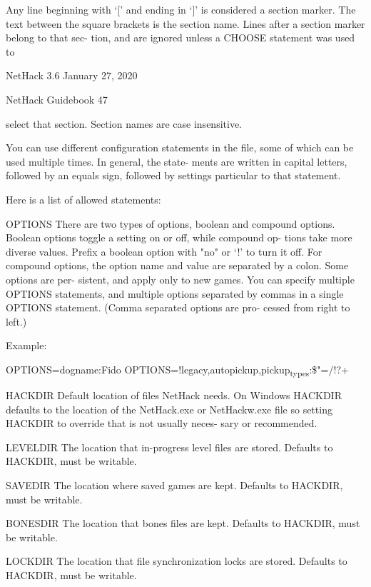 \documentclass[11pt]{article}
\begin{document}
   Any line beginning with `[' and ending in `]' is considered
a section marker.  The text between the square brackets is the
section name. Lines after a section marker belong to that sec-
tion, and are ignored unless a CHOOSE statement was used to


NetHack 3.6                   January 27, 2020





NetHack Guidebook                       47



select that section. Section names are case insensitive.

   You can use different configuration statements in the file,
some of which can be used multiple times. In general, the state-
ments are written in capital letters, followed by an equals sign,
followed by settings particular to that statement.

Here is a list of allowed statements:

OPTIONS
 There are two types of options, boolean and compound options.
 Boolean options toggle a setting on or off, while compound op-
 tions take more diverse values. Prefix a boolean option with
 "no" or `!' to turn it off. For compound options, the option
 name and value are separated by a colon. Some options are per-
 sistent, and apply only to new games. You can specify multiple
 OPTIONS statements, and multiple options separated by commas in
 a single OPTIONS statement. (Comma separated options are pro-
 cessed from right to left.)

Example:

OPTIONS=dogname:Fido
OPTIONS=!legacy,autopickup,pickup\textsubscript{types}:\$"=/!?+

HACKDIR
 Default location of files NetHack needs. On Windows HACKDIR
 defaults to the location of the NetHack.exe or NetHackw.exe
 file so setting HACKDIR to override that is not usually neces-
 sary or recommended.

LEVELDIR
 The location that in-progress level files are stored. Defaults
 to HACKDIR, must be writable.

SAVEDIR
 The location where saved games are kept. Defaults to HACKDIR,
 must be writable.

BONESDIR
 The location that bones files are kept. Defaults to HACKDIR,
 must be writable.

LOCKDIR
 The location that file synchronization locks are stored.
 Defaults to HACKDIR, must be writable.
\end{document}
